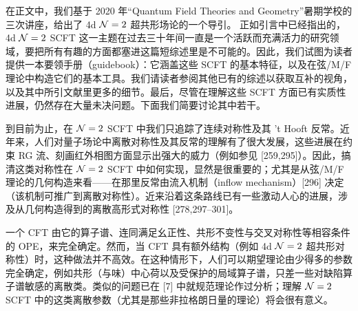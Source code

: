 

在正文中，我们基于 2020 年“Quantum Field Theories and Geometry”暑期学校的三次讲座，给出了 4d $\mathcal{N}=2$ 超共形场论的一个导引。
正如引言中已经指出的，4d $\mathcal{N}=2$ SCFT 这一主题在过去三十年间一直是一个活跃而充满活力的研究领域，要把所有有趣的方面都塞进这篇短综述里是不可能的。因此，我们试图为读者提供一本要领手册（guidebook）：它涵盖这些 SCFT 的基本特征，以及在弦/M/F 理论中构造它们的基本工具。我们请读者参阅其他已有的综述以获取互补的视角，以及其中所引文献里更多的细节。最后，尽管在理解这些 SCFT 方面已有实质性进展，仍然存在大量未决问题。下面我们简要讨论其中若干。

到目前为止，在 $\mathcal{N}=2$ SCFT 中我们只追踪了连续对称性及其 't Hooft 反常。近年来，人们对量子场论中离散对称性及其反常的理解有了很大发展，这些进展在约束 RG 流、刻画红外相图方面显示出强大的威力（例如参见 [259,295]）。因此，搞清这类对称性在 $\mathcal{N}=2$ SCFT 中如何实现，显然是很重要的；尤其是从弦/M/F 理论的几何构造来看——在那里反常由流入机制（inflow mechanism）[296] 决定（该机制可推广到离散对称性）。近来沿着这条路线已有一些激动人心的进展，涉及从几何构造得到的离散高形式对称性 [278,297--301]。


一个 CFT 由它的算子谱、连同满足幺正性、共形不变性与交叉对称性等相容条件的 OPE，来完全确定。然而，当 CFT 具有额外结构（例如 4d $\mathcal{N}=2$ 超共形对称性）时，这种做法并不高效。在这种情形下，人们可以期望理论由少得多的参数完全确定，例如共形（与味）中心荷以及受保护的局域算子谱，只差一些对缺陷算子谱敏感的离散类。类似的问题已在 [7] 中就规范理论作过分析；理解 $\mathcal{N}=2$ SCFT 中的这类离散参数（尤其是那些非拉格朗日量的理论）将会很有意义。

